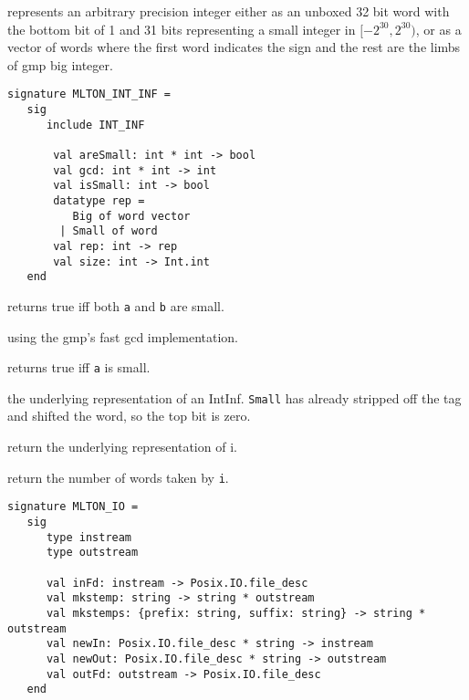 {\mlton} represents an arbitrary precision integer either as an
unboxed 32 bit word with the bottom bit of 1 and 31 bits representing
a small integer in $[-2^{30}, 2^{30})$, or as a vector of words where
the first word indicates the sign and the rest are the limbs of gmp
big integer.
\begin{verbatim}
signature MLTON_INT_INF =
   sig
      include INT_INF

       val areSmall: int * int -> bool
       val gcd: int * int -> int 
       val isSmall: int -> bool
       datatype rep =
          Big of word vector
        | Small of word
       val rep: int -> rep
       val size: int -> Int.int
   end
\end{verbatim}

\begin{description}
returns true iff both {\tt a} and {\tt b} are small.

using the gmp's fast gcd implementation.

returns true iff {\tt a} is small.

the underlying representation of an IntInf.  {\tt Small} has already
stripped off the tag and shifted the word, so the top bit is zero.

return the underlying representation of i.

return the number of words taken by {\tt i}.

\end{description}


\begin{verbatim}
signature MLTON_IO =
   sig
      type instream
      type outstream

      val inFd: instream -> Posix.IO.file_desc
      val mkstemp: string -> string * outstream
      val mkstemps: {prefix: string, suffix: string} -> string * outstream
      val newIn: Posix.IO.file_desc * string -> instream
      val newOut: Posix.IO.file_desc * string -> outstream
      val outFd: outstream -> Posix.IO.file_desc
   end
\end{verbatim}

